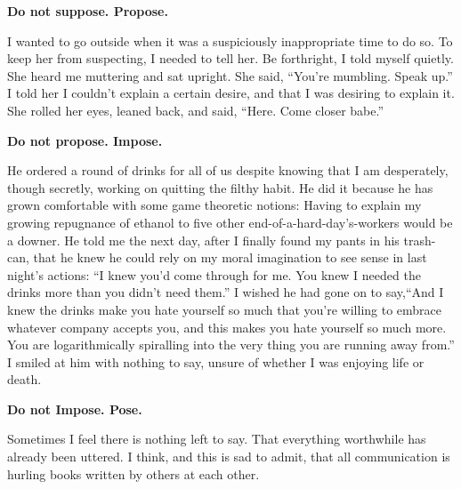 \documentclass{article}
\begin{document}
\newline

\textbf{Do not suppose. Propose.}
\newline

I wanted to go outside when it was a suspiciously inappropriate time to
do so. To keep her from suspecting, I needed to tell her. Be forthright,
I told myself quietly. She heard me muttering and sat upright. She
said, ``You're mumbling. Speak up.'' I told her I couldn't explain
a certain desire, and that I was desiring to explain it. She rolled her
eyes, leaned back, and said, ``Here. Come closer babe.'' \newline
\newline

\textbf{Do not propose. Impose.}
\newline

He ordered a round of drinks for all of us despite knowing that I am
desperately, though secretly, working on quitting the filthy habit. He
did it because he has grown comfortable with some game theoretic
notions: Having to explain my growing repugnance of ethanol to five
other end-of-a-hard-day's-workers would be a downer. He told me the next
day, after I finally found my pants in his trash-can, that he knew he
could rely on my moral imagination to see sense in last night's actions:
``I knew you'd come through for me. You knew I needed the drinks more
than you didn't need them.'' I wished he had gone on to say,``And
I knew the drinks make you hate yourself so much that you're willing to
embrace whatever company accepts you, and this makes you hate yourself
so much more. You are logarithmically spiralling into the very thing you
are running away from.'' I smiled at him with nothing
to say, unsure of whether I was enjoying life or death. \newline
\newline


\textbf{Do not Impose. Pose.}
\newline

Sometimes I feel there is nothing left to say. That everything
worthwhile has already been uttered. I think, and this is sad to admit,
that all communication is hurling books written by others at each
other.\newline \newline
\end{document}
